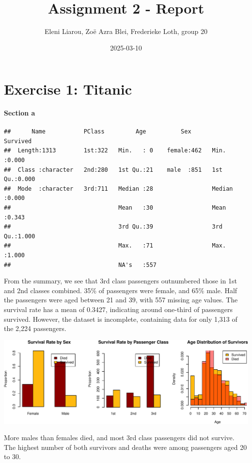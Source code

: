 \documentclass[
  11pt,
]{article}
\title{Assignment 2 - Report}
\author{Eleni Liarou, Zoë Azra Blei, Frederieke Loth, group 20}
\date{2025-03-10}
\begin{document}
\maketitle

\section{Exercise 1: Titanic}\label{exercise-1-titanic}

\paragraph{Section a}\label{section-a}

\begin{verbatim}
##      Name           PClass         Age          Sex         Survived    
##  Length:1313        1st:322   Min.   : 0    female:462   Min.   :0.000  
##  Class :character   2nd:280   1st Qu.:21    male  :851   1st Qu.:0.000  
##  Mode  :character   3rd:711   Median :28                 Median :0.000  
##                               Mean   :30                 Mean   :0.343  
##                               3rd Qu.:39                 3rd Qu.:1.000  
##                               Max.   :71                 Max.   :1.000  
##                               NA's   :557
\end{verbatim}

From the summary, we see that 3rd class passengers outnumbered those in
1st and 2nd classes combined. 35\% of passengers were female, and 65\%
male. Half the passengers were aged between 21 and 39, with 557 missing
age values. The survival rate has a mean of 0.3427, indicating around
one-third of passengers survived. However, the dataset is incomplete,
containing data for only 1,313 of the 2,224 passengers.

\includegraphics{ReportAssignment2_files/figure-latex/unnamed-chunk-2-1.pdf}

More males than females died, and most 3rd class passengers did not
survive. The highest number of both survivors and deaths were among
passengers aged 20 to 30.
\end{document}
